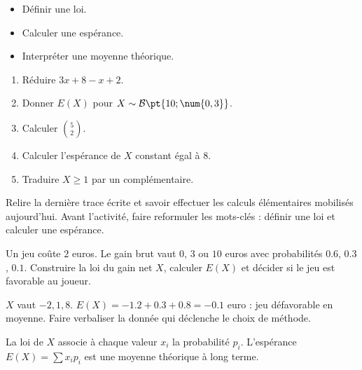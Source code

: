 \begin{objectives}\begin{itemize}\item Définir une loi.\item Calculer une espérance.\item Interpréter une moyenne théorique.\end{itemize}\end{objectives}
\begin{fluency}\begin{enumerate}\item Réduire $3x+8-x+2$. \item Donner $E(X)$ pour $X\sim\mathcal B\pt{10;\num{0,3}}$. \item Calculer $\binom52$. \item Calculer l'espérance de $X$ constant égal à $8$. \item Traduire $X\geq1$ par un complémentaire. \end{enumerate}\end{fluency}
\begin{prerequisites}Relire la dernière trace écrite et savoir effectuer les calculs élémentaires mobilisés aujourd'hui. Avant l'activité, faire reformuler les mots-clés : définir une loi et calculer une espérance.\end{prerequisites}

\begin{activity}
Un jeu coûte $2$ euros. Le gain brut vaut $0$, $3$ ou $10$ euros avec probabilités $\num{0,6}$, $\num{0,3}$, $\num{0,1}$. Construire la loi du gain net $X$, calculer $E(X)$ et décider si le jeu est favorable au joueur.

\end{activity}
\begin{solution}$X$ vaut $-2,1,8$. $E(X)=-\num{1,2}+\num{0,3}+\num{0,8}=-\num{0,1}$ euro : jeu défavorable en moyenne. Faire verbaliser la donnée qui déclenche le choix de méthode.\end{solution}

\begin{summary}La loi de $X$ associe à chaque valeur $x_i$ la probabilité $p_i$. L'espérance $E(X)=\sum x_ip_i$ est une moyenne théorique à long terme.\end{summary}

